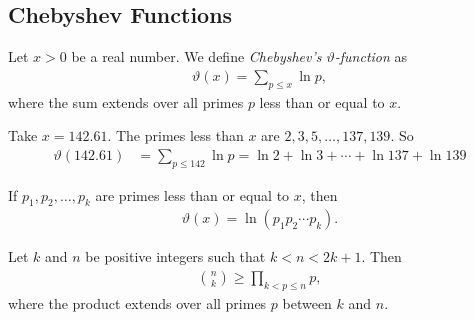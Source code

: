 
\subsection{Chebyshev Functions}
	\begin{definition}
		Let $x>0$ be a real number. We define \textit{Chebyshev's $\vartheta$-function} as
			\begin{align*}
				\vartheta(x)= \sum_{p \leq x} \ln p,
			\end{align*}
		where the sum extends over all primes $p$ less than or equal to $x$.
	\end{definition}
	
	\begin{example}
		Take $x=142.61$. The primes less than $x$ are $2, 3, 5, \ldots, 137, 139$. So
			\begin{align*}
				\vartheta(142.61)&=\sum_{p \leq 142} \ln p = \ln 2 + \ln 3 + \cdots + \ln 137 + \ln 139
			\end{align*}
	\end{example}
	
	\begin{corollary}
		If $p_1, p_2, \ldots, p_k$ are primes less than or equal to $x$, then
			\begin{align*}
			\vartheta(x)= \ln \left( p_1p_2\cdots p_k\right).
			\end{align*}			
	\end{corollary}
	
	\begin{lemma}
		\label{lem:binomialprimeinequality}
		Let $k$ and $n$ be positive integers such that $k<n < 2k+1 $. Then
			\begin{align*}
				\binom{n}{k} \geq \prod_{k < p \leq n} p,
			\end{align*}
		where the product extends over all primes $p$ between $k$ and $n$.
	\end{lemma}
	
